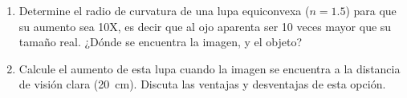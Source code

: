 \item
\begin{enumerate}
	\item Determine el radio de curvatura de una lupa equiconvexa (\(n = \num{1.5}\)) para que su aumento sea 10X, es decir que al ojo aparenta ser \num{10} veces mayor que su tamaño real.
	¿Dónde se encuentra la imagen, y el objeto?
	\item Calcule el aumento de esta lupa cuando la imagen se encuentra a la distancia de visión clara (\SI{20}{\centi\metre}).
	Discuta las ventajas y desventajas de esta opción.
\end{enumerate}
